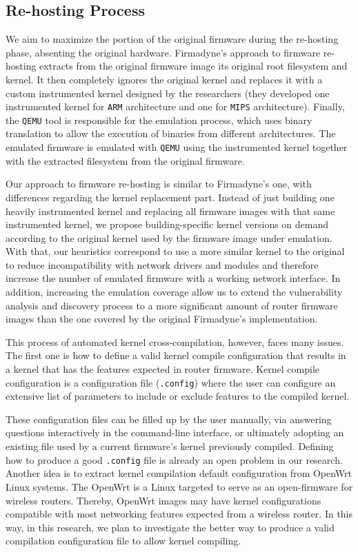 \documentclass[12pt]{article}
\begin{document}
\subsection{Re-hosting Process}
\label{sec:re-hosting}

We aim to maximize the portion of the original firmware during the re-hosting phase, absenting the original hardware. Firmadyne's approach to firmware re-hosting extracts from the original firmware image its original root filesystem and kernel. It then completely ignores the original kernel and replaces it with a custom instrumented kernel designed by the researchers (they developed one instrumented kernel for {\tt ARM} architecture and one for {\tt MIPS} architecture). Finally, the {\tt QEMU} tool is responsible for the emulation process, which uses binary translation to allow the execution of binaries from different architectures. The emulated firmware is emulated with {\tt QEMU} using the instrumented kernel together with the extracted filesystem from the original firmware.

Our approach to firmware re-hosting is similar to Firmadyne's one, with differences regarding the kernel replacement part. Instead of just building one heavily instrumented kernel and replacing all firmware images with that same instrumented kernel, we propose building-specific kernel versions on demand according to the original kernel used by the firmware image under emulation. With that, our heuristics correspond to use a more similar kernel to the original to reduce incompatibility with network drivers and modules and therefore increase the number of emulated firmware with a working network interface. In addition, increasing the emulation coverage allow us to extend the vulnerability analysis and discovery process to a more significant amount of router firmware images than the one covered by the original Firmadyne's implementation.

This process of automated kernel cross-compilation, however, faces many issues. The first one is how to define a valid kernel compile configuration that results in a kernel that has the features expected in router firmware. Kernel compile configuration is a configuration file ({\tt .config}) where the user can configure an extensive list of parameters to include or exclude features to the compiled kernel.

These configuration files can be filled up by the user manually, via answering questions interactively in the command-line interface, or ultimately adopting an existing file used by a current firmware's kernel previously compiled. Defining how to produce a good {\tt .config} file is already an open problem in our research. Another idea is to extract kernel compilation default configuration from OpenWrt Linux systems. The OpenWrt is a Linux targeted to serve as an open-firmware for wireless routers. Thereby, OpenWrt images may have kernel configurations compatible with most networking features expected from a wireless router. In this way, in this research, we plan to investigate the better way to produce a valid compilation configuration file to allow kernel compiling.
\end{document}
